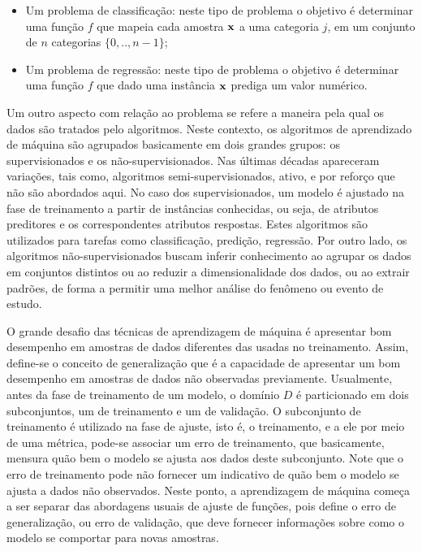 \begin{itemize}
\item Um problema de classificação: neste tipo de problema o objetivo é determinar uma função $f$ que mapeia cada amostra $\bf x$ a uma categoria $j$, em um conjunto de $n$ categorias $\{0,..,n-1\}$;
\item Um problema de regressão: neste tipo de problema o objetivo é determinar uma função $f$ que dado uma instância $\bf x$ prediga um valor numérico.
\end{itemize}

Um outro aspecto com relação ao problema se refere a maneira pela qual os dados são tratados pelo algoritmos. Neste contexto, os algoritmos de aprendizado de máquina são agrupados basicamente em dois grandes grupos: os supervisionados e os não-supervisionados. Nas últimas décadas apareceram variações, tais como, algoritmos semi-supervisionados, ativo, e por reforço que não são abordados aqui. No caso dos supervisionados, um modelo é ajustado na fase de treinamento a partir de instâncias conhecidas, ou seja, de atributos preditores e os correspondentes atributos respostas. Estes algoritmos são utilizados para tarefas como classificação, predição, regressão. Por outro lado, os algoritmos não-supervisionados buscam inferir conhecimento ao agrupar os dados em conjuntos distintos ou ao reduzir a dimensionalidade dos dados, ou ao extrair padrões, de forma a permitir uma melhor análise do fenômeno ou evento de estudo.

O grande desafio das técnicas de aprendizagem de máquina é apresentar bom desempenho em amostras de dados diferentes das usadas no treinamento. Assim, define-se o conceito de generalização que é a capacidade de apresentar um bom desempenho em amostras de dados não observadas previamente. Usualmente, antes da fase de treinamento de um modelo, o domínio $D$ é particionado em dois subconjuntos, um de treinamento e um de validação. O subconjunto de treinamento é utilizado na fase de ajuste, isto é, o treinamento, e a ele por meio de uma métrica, pode-se associar um erro de treinamento, que basicamente, mensura quão bem o modelo se ajusta aos dados deste subconjunto. Note que o erro de treinamento pode não fornecer um indicativo de quão bem o modelo se ajusta a dados não observados. Neste ponto, a aprendizagem de máquina começa a ser separar das abordagens usuais de ajuste de funções, pois define o erro de generalização, ou erro de validação, que deve fornecer informações sobre como o modelo se comportar para novas amostras.

